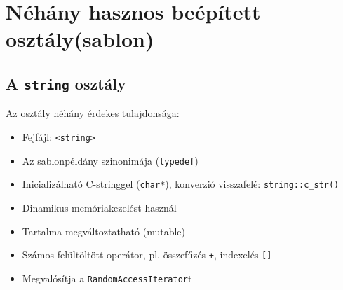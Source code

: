 \section{Néhány hasznos beépített osztály(sablon)}

\subsection{A \texttt{string} osztály}

\begin{frame}
    Az  osztály néhány érdekes tulajdonsága:
    \begin{itemize}
        \item Fejfájl: \texttt{<string>}
        \item Az  sablonpéldány szinonimája (\texttt{typedef})
        \item Inicializálható C-stringgel (\texttt{char*}), konverzió visszafelé: \texttt{string::c\_str()}
        \item Dinamikus memóriakezelést használ
        \item Tartalma megváltoztatható (mutable)
        \item Számos felültöltött operátor, pl. összefűzés \texttt{+}, indexelés \texttt{[]}
        \item Megvalósítja a \texttt{RandomAccessIterator}t
    \end{itemize}
\end{frame}

\begin{frame}
    \begin{exampleblock}{}
        \scriptsize
        
        
    \end{exampleblock}
\end{frame}

